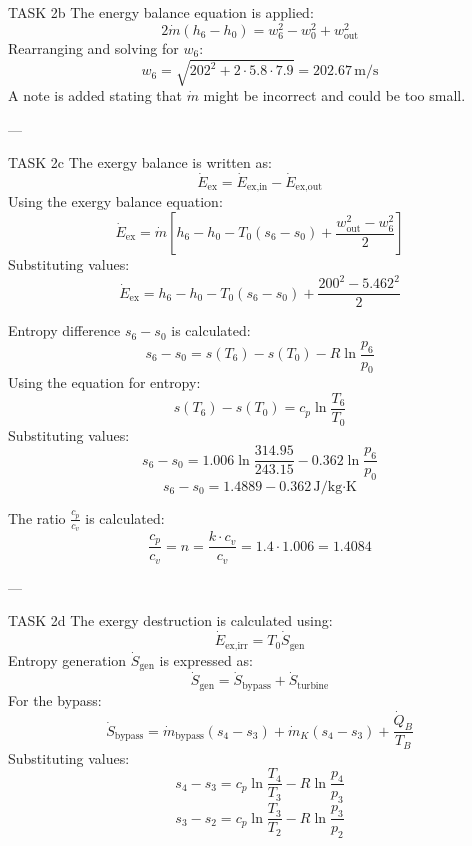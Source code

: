 TASK 2b  
The energy balance equation is applied:  
\[
2 \dot{m} (h_6 - h_0) = w_6^2 - w_0^2 + w_{\text{out}}^2
\]  
Rearranging and solving for \( w_6 \):  
\[
w_6 = \sqrt{202^2 + 2 \cdot 5.8 \cdot 7.9} = 202.67 \, \text{m/s}
\]  
A note is added stating that \( \dot{m} \) might be incorrect and could be too small.

---

TASK 2c  
The exergy balance is written as:  
\[
\dot{E}_{\text{ex}} = \dot{E}_{\text{ex,in}} - \dot{E}_{\text{ex,out}}
\]  
Using the exergy balance equation:  
\[
\dot{E}_{\text{ex}} = \dot{m} \left[ h_6 - h_0 - T_0 (s_6 - s_0) + \frac{w_{\text{out}}^2 - w_6^2}{2} \right]
\]  
Substituting values:  
\[
\dot{E}_{\text{ex}} = h_6 - h_0 - T_0 (s_6 - s_0) + \frac{200^2 - 5.462^2}{2}
\]  

Entropy difference \( s_6 - s_0 \) is calculated:  
\[
s_6 - s_0 = s(T_6) - s(T_0) - R \ln \frac{p_6}{p_0}
\]  
Using the equation for entropy:  
\[
s(T_6) - s(T_0) = c_p \ln \frac{T_6}{T_0}
\]  
Substituting values:  
\[
s_6 - s_0 = 1.006 \ln \frac{314.95}{243.15} - 0.362 \ln \frac{p_6}{p_0}
\]  
\[
s_6 - s_0 = 1.4889 - 0.362 \, \text{J/kg·K}
\]  

The ratio \( \frac{c_p}{c_v} \) is calculated:  
\[
\frac{c_p}{c_v} = n = \frac{k \cdot c_v}{c_v} = 1.4 \cdot 1.006 = 1.4084
\]  

---

TASK 2d  
The exergy destruction is calculated using:  
\[
\dot{E}_{\text{ex,irr}} = T_0 \dot{S}_{\text{gen}}
\]  
Entropy generation \( \dot{S}_{\text{gen}} \) is expressed as:  
\[
\dot{S}_{\text{gen}} = \dot{S}_{\text{bypass}} + \dot{S}_{\text{turbine}}
\]  
For the bypass:  
\[
\dot{S}_{\text{bypass}} = \dot{m}_{\text{bypass}} (s_4 - s_3) + \dot{m}_K (s_4 - s_3) + \frac{\dot{Q}_B}{T_B}
\]  
Substituting values:  
\[
s_4 - s_3 = c_p \ln \frac{T_4}{T_3} - R \ln \frac{p_4}{p_3}
\]  
\[
s_3 - s_2 = c_p \ln \frac{T_3}{T_2} - R \ln \frac{p_3}{p_2}
\]